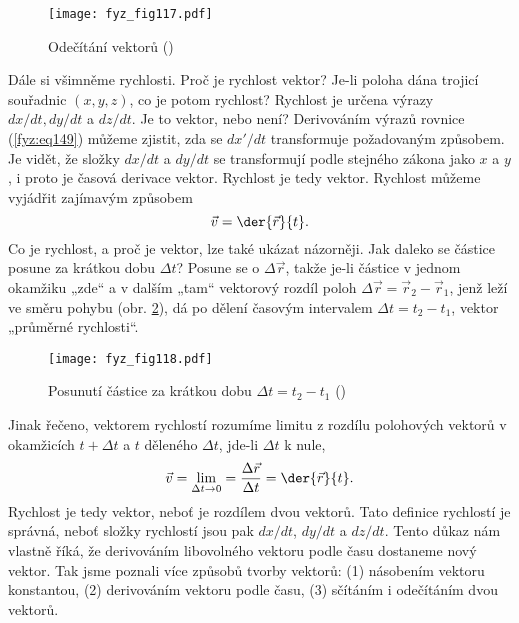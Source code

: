     \begin{figure}[ht!]  %
      \centering
      \texttt{[image: fyz\_fig117.pdf]}
      \caption{Odečítání vektorů
              (\cite[s.~161]{Feynman01})}
      \label{fyz:fig117}
    \end{figure}
    Dále si všimněme rychlosti. Proč je rychlost vektor? Je-li poloha dána trojicí souřadnic 
    \((x,y, z)\), co je potom rychlost? Rychlost je určena výrazy \(dx/dt, dy/dt\) a \(dz/dt\). Je 
    to vektor, nebo není? Derivováním výrazů rovnice (\ref{fyz:eq149}) můžeme zjistit, zda se 
    \(dx'/dt\) transformuje požadovaným způsobem. Je vidět, že složky \(dx/dt\) a \(dy/dt\) se 
    transformují podle stejného zákona jako \(x\) a \(y\), i proto je časová derivace vektor. 
    Rychlost je tedy vektor. Rychlost můžeme vyjádřit zajímavým způsobem
    \begin{equation*}
      \vec{v} = \der{\vec{r}}{t}.
    \end{equation*}    
    Co je rychlost, a proč je vektor, lze také ukázat názorněji. Jak daleko se částice posune za 
    krátkou dobu \(\Delta t\)? Posune se o \(\Delta\vec{r}\), takže je-li částice v jednom okamžiku 
    „zde“ a v dalším „tam“ vektorový rozdíl poloh \(\Delta\vec{r} = \vec{r}_2 - \vec{r}_1\), jenž 
    leží ve směru pohybu (obr. \ref{fyz:fig118}), dá po dělení časovým intervalem \(\Delta t = t_2 
    - t_1\), vektor „průměrné rychlosti“.

    \begin{figure}[ht!]  %
      \centering
      \texttt{[image: fyz\_fig118.pdf]}
      \caption{Posunutí částice za krátkou dobu \(\Delta t = t_2 - t_1\)
              (\cite[s.~162]{Feynman01})}
      \label{fyz:fig118}
    \end{figure}
    Jinak řečeno, vektorem rychlostí rozumíme limitu z rozdílu polohových vektorů v okamžicích \(t 
    + \Delta t\) a \(t\) děleného \(\Delta t\), jde-li \(\Delta t\) k nule,
    \begin{equation}\label{fyz:eq154}
      \vec{v} = \lim\limits_{\Delta t\to0} = \frac{\Delta\vec{r}}{\Delta t}
              = \der{\vec{r}}{t}.
    \end{equation}
    Rychlost je tedy vektor, neboť je rozdílem dvou vektorů. Tato definice rychlostí je správná, 
    neboť složky rychlostí jsou pak \(dx/dt\), \(dy/dt\) a \(dz/dt\). Tento důkaz nám vlastně říká, 
    že derivováním libovolného vektoru podle času dostaneme nový vektor. Tak jsme poznali více 
    způsobů tvorby vektorů: (1) násobením vektoru konstantou, (2) derivováním vektoru podle času, 
    (3) sčítáním i odečítáním dvou vektorů. 

